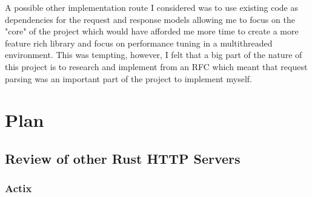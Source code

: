 \documentclass[12pt, a4paper]{article}
\begin{document}
A possible other implementation route I considered was to use existing code as dependencies for the
request and response models allowing me to focus on the "core" of the project which would have afforded
me more time to create a more feature rich library and focus on performance tuning in a multithreaded
environment. This was tempting, however, I felt that a big part of the nature of this project is to
research and implement from an RFC which meant that request parsing was an important part of the
project to implement myself.

\section{Plan} \label{sec:plan}


\subsection{Review of other Rust HTTP Servers}

\subsubsection{Actix}

    
\newpage
\printbibliography
\end{document}

